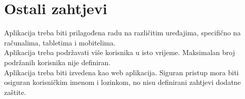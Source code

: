 		\section{Ostali zahtjevi}
			 
			 \text Aplikacija treba biti prilagođena radu na različitim uređajima, specifično na računalima, tabletima i mobitelima. \\
			 \text Aplikacija treba podržavati više korisnika u isto vrijeme. Maksimalan broj podržanih korisnika nije definiran. \\
			 \text Aplikacija treba biti izvedena kao web aplikacija. Siguran pristup mora biti osiguran korisničkim imenom i lozinkom, no nisu definirani zahtjevi dodatne zaštite.
			 
			 
			 
	